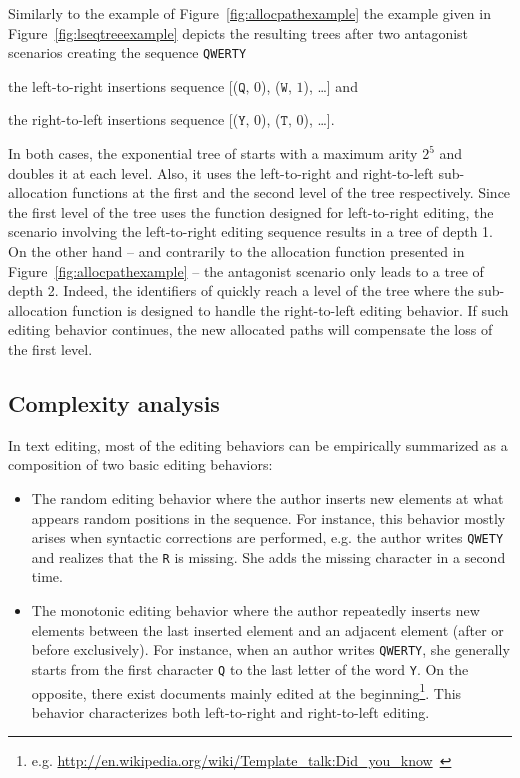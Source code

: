 Similarly to the example of Figure~\ref{fig:allocpathexample} the example given
in Figure~\ref{fig:lseqtreeexample} depicts the resulting trees after two
antagonist scenarios creating the sequence \texttt{QWERTY}
\begin{inparaenum}[(i)]
\item the left-to-right insertions sequence [($\texttt{Q},\,0$), ($\texttt{W},\,1$),
  \ldots] and
\item the right-to-left insertions sequence [($\texttt{Y},\,0$),
  ($\texttt{T},\,0$), \ldots].
\end{inparaenum}
In both cases, the exponential tree of \LSEQ starts with a maximum arity $2^5$
and doubles it at each level. Also, it uses the left-to-right and right-to-left
sub-allocation functions at the first and the second level of the tree
respectively. Since the first level of the tree uses the function designed for
left-to-right editing, the scenario involving the left-to-right editing sequence
results in a tree of depth 1. On the other hand -- and contrarily to the
allocation function presented in Figure~\ref{fig:allocpathexample} -- the
antagonist scenario only leads to a tree of depth 2. Indeed, the identifiers of
\LSEQ quickly reach a level of the tree where the sub-allocation function is
designed to handle the right-to-left editing behavior. If such editing behavior
continues, the new allocated paths will compensate the loss of the first level.

\subsection{Complexity analysis}
\label{subsec:complexity}

In text editing, most of the editing behaviors can be empirically summarized as
a composition of two basic editing behaviors:
\begin{itemize}
\item The random editing behavior where the author inserts new elements at what
  appears random positions in the sequence. For instance, this behavior mostly
  arises when syntactic corrections are performed, e.g. the author writes
  \texttt{QWETY} and realizes that the \texttt{R} is missing. She adds the
  missing character in a second time.
\item The monotonic editing behavior where the author repeatedly inserts new
  elements between the last inserted element and an adjacent element (after or
  before exclusively). For instance, when an author writes \texttt{QWERTY}, she
  generally starts from the first character \texttt{Q} to the last letter of the
  word \texttt{Y}. On the opposite, there exist documents mainly edited at the
  beginning\footnote{e.g. \url{http://en.wikipedia.org/wiki/Template_talk:Did_you_know}~\cite{nedelec2013lseq}}. This
  behavior characterizes both left-to-right and right-to-left editing.
\end{itemize}

